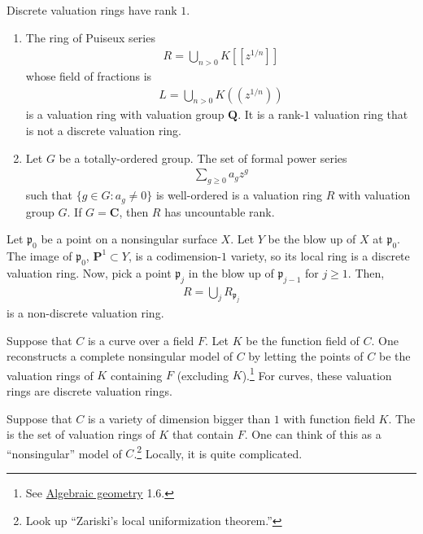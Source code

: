\documentclass [11 pt, oneside] {article}
\begin{document}
\begin{remark}
	Discrete valuation rings have rank $1$.
\end{remark}

\begin{example}\label{}\text{}
\begin{enumerate}
	\item The ring of Puiseux series
		\begin{align*}
			R = \bigcup_{n>0} K[\![z^{1/n}]\!]
		\end{align*}
		whose field of fractions is
		\begin{align*}
			L = \bigcup_{n>0} K(\!(z^{1/n})\!)
		\end{align*}
		is a valuation ring with valuation group $\mathbf{Q}$. It is a rank-$1$ valuation ring that is not a discrete valuation ring. 
	\item Let $G$ be a totally-ordered group. The set of formal power series
		\begin{align*}
			\sum_{g\ge 0}^{} a_gz^g
		\end{align*}
		such that $\{g\in G: a_g\ne 0\}$ is well-ordered is a valuation ring $R$ with valuation group $G$. If $G=\mathbf{C}$, then $R$ has uncountable rank.
\end{enumerate}
\end{example}

Let $\mathfrak{p}_0$ be a point on a nonsingular surface $X$. Let $Y$ be the blow up of $X$ at $\mathfrak{p}_0$. The image of $\mathfrak{p}_0$, $\mathbf{P}^1\subset Y$, is a codimension-$1$ variety, so its local ring is a discrete valuation ring. Now, pick a point $\mathfrak{p}_j$ in the blow up of $\mathfrak{p}_{j-1}$ for $j\ge 1$. Then,
\begin{align*}
	R = \bigcup_j R_{\mathfrak{p}_j}
\end{align*}
is a non-discrete valuation ring.

Suppose that $C$ is a curve over a field $F$. Let $K$ be the function field of $C$. One reconstructs a complete nonsingular model of $C$ by letting the points of $C$ be the valuation rings of $K$ containing $F$ (excluding $K$).\footnote{See \ul{Algebraic geometry} 1.6.} For curves, these valuation rings are discrete valuation rings.

Suppose that $C$ is a variety of dimension bigger than $1$ with function field $K$. The  is the set of valuation rings of $K$ that contain $F$. One can think of this as a ``nonsingular'' model of $C$.\footnote{Look up ``Zariski's local uniformization theorem.''} Locally, it is quite complicated.
\end{document}
